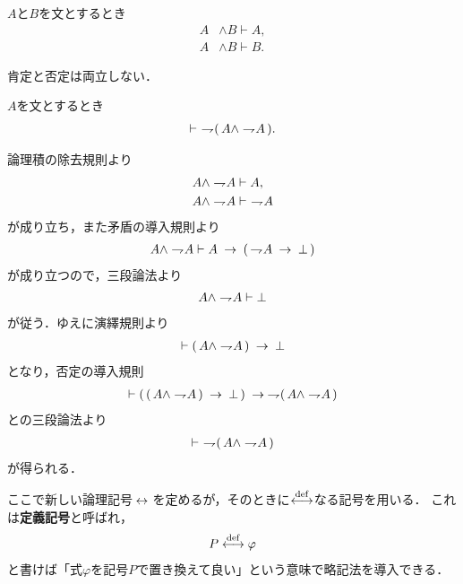 	\begin{screen}
		\begin{logicalaxm}[論理積の除去]
		\label{logicalaxm:elimination_of_conjunction}
			$A$と$B$を文とするとき
			\begin{align}
				A &\wedge B \vdash A, \\
				A &\wedge B \vdash B.
			\end{align}
		\end{logicalaxm}
	\end{screen}
	
	肯定と否定は両立しない．
	
	\begin{screen}
		\begin{logicalthm}[無矛盾律]
		\label{logicalthm:law_of_noncontradiction}
			$A$を文とするとき
			\begin{align}
				\vdash\ \rightharpoondown\hspace{-0.25em} (\, A \wedge \rightharpoondown\hspace{-0.25em} A\, ).
			\end{align}
		\end{logicalthm}
	\end{screen}
	
	\begin{prf}
		論理積の除去規則より
		\begin{align}
			A \wedge \rightharpoondown\hspace{-0.25em} A &\vdash A, \\
			A \wedge \rightharpoondown\hspace{-0.25em} A &\vdash\ \rightharpoondown\hspace{-0.25em} A
		\end{align}
		が成り立ち，また矛盾の導入規則より
		\begin{align}
			A \wedge \rightharpoondown\hspace{-0.25em} A \vdash A \hspace{0.25em}\rightarrow\hspace{0.25em} (\, \rightharpoondown\hspace{-0.25em} A \hspace{0.25em}\rightarrow\hspace{0.25em} \bot\, )
		\end{align}
		が成り立つので，三段論法より
		\begin{align}
			A \wedge \rightharpoondown\hspace{-0.25em} A \vdash \bot
		\end{align}
		が従う．ゆえに演繹規則より
		\begin{align}
			\vdash (\, A \wedge \rightharpoondown\hspace{-0.25em} A\, ) \hspace{0.25em}\rightarrow\hspace{0.25em} \bot
		\end{align}
		となり，否定の導入規則
		\begin{align}
			\vdash (\, (\, A \wedge \rightharpoondown\hspace{-0.25em} A\, ) \hspace{0.25em}\rightarrow\hspace{0.25em} \bot\, )
			\hspace{0.25em}\rightarrow\hspace{0.25em} \rightharpoondown\hspace{-0.25em} (\, A \wedge \rightharpoondown\hspace{-0.25em} A\, )
		\end{align}
		との三段論法より
		\begin{align}
			\vdash\ \rightharpoondown\hspace{-0.25em} (\, A \wedge \rightharpoondown\hspace{-0.25em} A\, )
		\end{align}
		が得られる．
		\QED
	\end{prf}
	
	ここで新しい論理記号$\hspace{0.25em}\leftrightarrow\hspace{0.25em}$を定めるが，そのときに$\overset{\mathrm{def}}{\longleftrightarrow}$なる記号を用いる．
	これは{\bf 定義記号}と呼ばれ，
	\begin{align}
		P \overset{\mathrm{def}}{\longleftrightarrow} \varphi
	\end{align}
	と書けば「式$\varphi$を記号$P$で置き換えて良い」という意味で略記法を導入できる．
	
